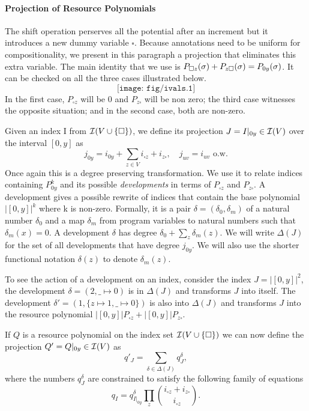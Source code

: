 \documentclass[nocopyrightspace,preprint]{sigplanconf-pldi15}
\begin{document}
\paragraph{Projection of Resource Polynomials}


The shift operation perserves all the potential after an increment
but it introduces a new dummy variable $\square$.  Because annotations
need to be uniform for compositionality, we present in this paragraph
a projection that eliminates this extra variable.  The main identity that
we use is $P_{\square z}(\sigma) + P_{z \square}(\sigma) =
P_{0y}(\sigma)$.  It can be checked on all the three cases illustrated
below.
$$
\texttt{[image: fig/ivals.1]}
$$
In the first case, $P_{\square z}$ will be 0 and $P_{z \square}$ will
be non zero; the third case witnesses the opposite situation; and in
the second case, both are non-zero.

Given an index I from $\mathcal{I}(V\cup \{ \square \})$, we define its projection
$J = I|_{0y} \in \mathcal{I}(V)$ over the interval $[0,y]$ as
$$
j_{0y} = i_{0y} + \sum_{z \in V} i_{\square z} + i_{z \square}, \quad
j_{uv} = i_{uv} \mbox{ o.w.}
$$
Once again this is a degree preserving transformation.  We use it to
relate indices containing $P_{0y}^k$ and its possible \emph{developments}
in terms of $P_{\square z}$ and $P_{z \square}$.  A development gives a
possible rewrite of indices that contain the base polynomial $
|[0,y]|^k$ where k is non-zero.  Formally, it is a pair $\delta =
(\delta_0, \delta_m)$ of a natural number $\delta_0$ and a map $\delta_m$
from program variables to natural numbers such that $\delta_m(x) = 0$.
A development $\delta$ has degree $\delta_0 + \sum_z \delta_m(z)$.  We
will write $\Delta(J)$ for the set of all developments that have degree
$j_{0y}$.  We will also use the shorter functional notation $\delta(z)$
to denote $\delta_m(z)$.

To see the action of a development on an index, consider the
index $J = |[0,y]|^2$, the development $\delta = (2, \_ \mapsto 0)$
is in $\Delta(J)$ and transforms $J$ into itself.  The development
$\delta' = (1, \{ z \mapsto 1, \_ \mapsto 0\})$ is also into $\Delta(J)$ and
transforms $J$ into the resource polynomial
$|[0,y]|P_{\square z} + |[0,y]|P_{z \square}$.

If $Q$ is a resource polynomial on the index set $\mathcal{I}(V\cup \{\square\})$ we
can now define the projection $Q' = Q|_{0y} \in \mathcal{I}(V)$ as
$$
q'_J = \sum_{\delta \in \Delta(J)} q^\delta_J,
$$
where the numbers $q^\delta_J$ are constrained to satisfy the following
family of equations
$$
q_I = q^\delta_{I|_{0y}} \prod_z \binom{i_{\square z} + i_{z \square}}{i_{\square z}}.
$$
\end{document}
